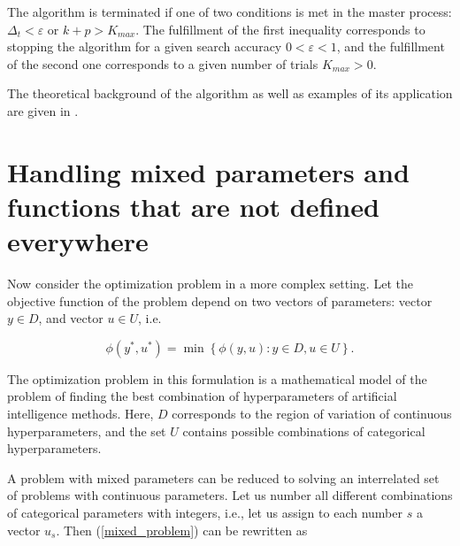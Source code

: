 \documentclass[runningheads]{llncs}
\begin{document}
The algorithm is terminated if one of two conditions is met in the master process: $\Delta_t< \varepsilon$ or $k+p>K_{max}$. The fulfillment of the first inequality corresponds to stopping the algorithm for a given search accuracy $0< \varepsilon <1$, and the fulfillment of the second one corresponds to a given number of trials $K_{max}>0$.

The theoretical background of the algorithm as well as examples of its application are given in  \cite{Barkalov2018,Barkalov2023,Gubaydullin2021,Strongin2020}.

\section{Handling mixed parameters and functions that are not defined everywhere}\label{sec:MP}

Now consider the optimization problem in a more complex setting. Let the objective function of the problem depend on two vectors of parameters: vector $y \in D$, and vector $u \in U$, i.e.

\begin{equation}\label{mixed_problem} 
\phi(y^*, u^*) = \min \left\{\phi(y, u): y \in D, u \in U\right\}.
\end{equation}

The optimization problem in this formulation is a mathematical model of the problem of finding the best combination of hyperparameters of artificial intelligence methods. Here, $D$ corresponds to the region of variation of continuous hyperparameters, and the set $U$ contains possible combinations of categorical hyperparameters.

A problem with mixed parameters can be reduced to solving an interrelated set of problems with continuous parameters. Let us number all different combinations of categorical parameters with integers, i.e., let us assign to each number $s$ a vector $u_s$. Then (\ref{mixed_problem}) can be rewritten as 
\end{document}
